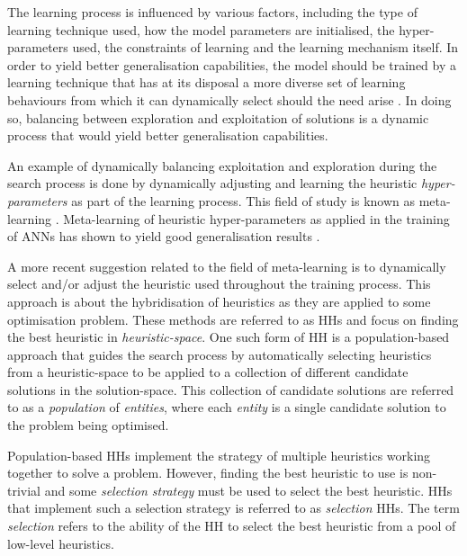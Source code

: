 The learning process is influenced by various factors, including the type of
learning technique used, how the model parameters are initialised, the
hyper-parameters used, the constraints of learning and the learning mechanism
itself. In order to yield better generalisation capabilities, the model should
be trained by a learning technique that has at its disposal a more diverse set
of learning behaviours from which it can dynamically select should the need arise
\cite{ref:huang:2009}. In doing so, balancing between exploration and
exploitation of solutions is a dynamic process that would yield better
generalisation capabilities.

An example of dynamically balancing exploitation and exploration during the
search process is done by dynamically adjusting and learning the heuristic
\textit{hyper-parameters} as part of the learning
process. This field of study is known as meta-learning
\cite{ref:giraud:2004}. Meta-learning of heuristic
hyper-parameters as applied in the training of \acp{ANN} has shown to yield good
generalisation results \cite{ref:hospedales:2020, ref:vilalta:2002}.

A more recent suggestion related to the field of
meta-learning is to dynamically select and/or adjust the
heuristic used throughout the training process. This approach is about the
hybridisation of heuristics as they are applied to some optimisation problem.
These methods are referred to as \acp{HH} and focus on finding the best
heuristic in \textit{heuristic-space}. One such form of \ac{HH} is a
population-based approach that guides the search process by automatically
selecting heuristics from a heuristic-space to be applied to a collection of
different candidate solutions in the solution-space. This collection of
candidate solutions are referred to as a \textit{population} of
\textit{entities}, where each \textit{entity} is a single candidate solution to
the problem being optimised.

Population-based \acp{HH} implement the strategy of multiple heuristics working
together to solve a problem. However, finding the best heuristic to use is
non-trivial and some \textit{selection strategy} must be used to select the best
heuristic. \acp{HH} that implement such a selection strategy is referred to as
\textit{selection} \acp{HH}. The term \textit{selection} refers to the ability
of the \ac{HH} to select the best heuristic from a pool of low-level heuristics.


